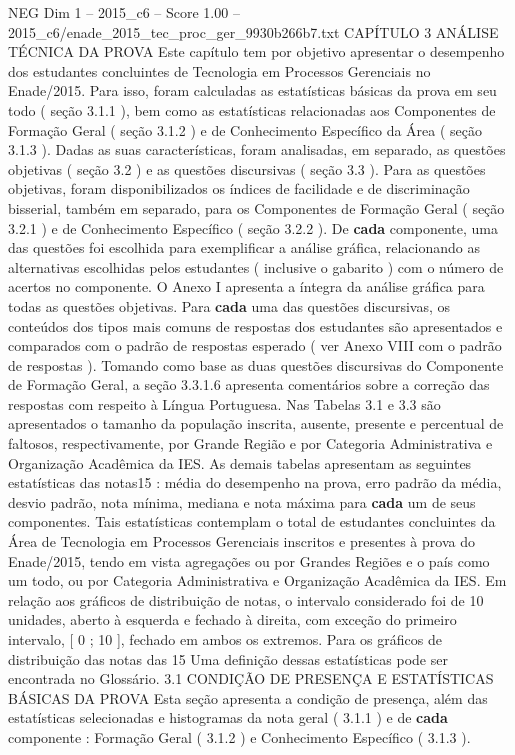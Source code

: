 \begin{textsample}{NEG Dim 1 – 2015\_c6 – Score 1.00 – 2015\_c6/enade\_2015\_tec\_proc\_ger\_9930b266b7.txt}  \label{ex:f1_neg_290}
CAPÍTULO 3 ANÁLISE TÉCNICA DA PROVA Este capítulo tem por objetivo apresentar o desempenho dos estudantes concluintes de Tecnologia em Processos Gerenciais no Enade/2015.
Para isso, foram calculadas as estatísticas básicas da prova em seu todo ( seção 3.1.1 ), bem como as estatísticas relacionadas aos Componentes de Formação Geral ( seção 3.1.2 ) e de Conhecimento Específico da Área ( seção 3.1.3 ).
Dadas as suas características, foram analisadas, em separado, as questões objetivas ( seção 3.2 ) e as questões discursivas ( seção 3.3 ).
Para as questões objetivas, foram disponibilizados os índices de facilidade e de discriminação bisserial, também em separado, para os Componentes de Formação Geral ( seção 3.2.1 ) e de Conhecimento Específico ( seção 3.2.2 ).
De \textbf{cada} componente, uma das questões foi escolhida para exemplificar a análise gráfica, relacionando as alternativas escolhidas pelos estudantes ( inclusive o gabarito ) com o número de acertos no componente.
O Anexo I apresenta a íntegra da análise gráfica para todas as questões objetivas.
Para \textbf{cada} uma das questões discursivas, os conteúdos dos tipos mais comuns de respostas dos estudantes são apresentados e comparados com o padrão de respostas esperado ( ver Anexo VIII com o padrão de respostas ).
Tomando como base as duas questões discursivas do Componente de Formação Geral, a seção 3.3.1.6 apresenta comentários sobre a correção das respostas com respeito à Língua Portuguesa.
Nas Tabelas 3.1 e 3.3 são apresentados o tamanho da população inscrita, ausente, presente e percentual de faltosos, respectivamente, por Grande Região e por Categoria Administrativa e Organização Acadêmica da IES.
As demais tabelas apresentam as seguintes estatísticas das notas15 : média do desempenho na prova, erro padrão da média, desvio padrão, nota mínima, mediana e nota máxima para \textbf{cada} um de seus componentes.
Tais estatísticas contemplam o total de estudantes concluintes da Área de Tecnologia em Processos Gerenciais inscritos e presentes à prova do Enade/2015, tendo em vista agregações ou por Grandes Regiões e o país como um todo, ou por Categoria Administrativa e Organização Acadêmica da IES.
Em relação aos gráficos de distribuição de notas, o intervalo considerado foi de 10 unidades, aberto à esquerda e fechado à direita, com exceção do primeiro intervalo, [ 0 ; 10 ], fechado em ambos os extremos.
Para os gráficos de distribuição das notas das 15 Uma definição dessas estatísticas pode ser encontrada no Glossário. 3.1 CONDIÇÃO DE PRESENÇA E ESTATÍSTICAS BÁSICAS DA PROVA Esta seção apresenta a condição de presença, além das estatísticas selecionadas e histogramas da nota geral ( 3.1.1 ) e de \textbf{cada} componente : Formação Geral ( 3.1.2 ) e Conhecimento Específico ( 3.1.3 ).

\end{textsample}

